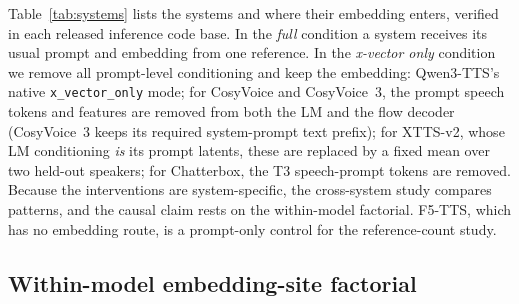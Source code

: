 \documentclass[10pt]{article}
\begin{document}
Table~\ref{tab:systems} lists the systems and where their embedding enters, verified in each released inference code base.
In the \emph{full} condition a system receives its usual prompt and embedding from one reference.
In the \emph{x-vector only} condition we remove all prompt-level conditioning and keep the embedding: Qwen3-TTS's native \texttt{x\_vector\_only} mode; for CosyVoice and CosyVoice~3, the prompt speech tokens and features are removed from both the LM and the flow decoder (CosyVoice~3 keeps its required system-prompt text prefix); for XTTS-v2, whose LM conditioning \emph{is} its prompt latents, these are replaced by a fixed mean over two held-out speakers; for Chatterbox, the T3 speech-prompt tokens are removed.
Because the interventions are system-specific, the cross-system study compares patterns, and the causal claim rests on the within-model factorial.
F5-TTS, which has no embedding route, is a prompt-only control for the reference-count study.

\begin{table}[t]
\centering
\caption{Systems, where their speaker embedding enters, and what the x-vector-only condition removes.}
\label{tab:systems}
\small
{}
\end{table}

\subsection{Within-model embedding-site factorial}
\end{document}
